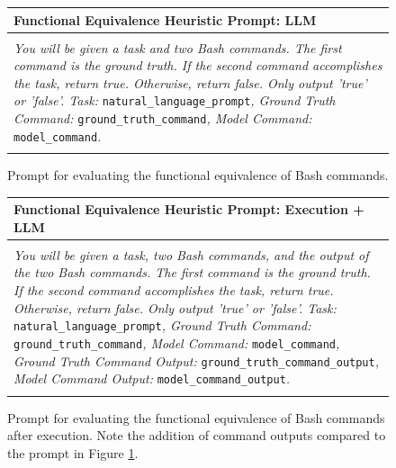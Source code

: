 \documentclass[11pt]{article}
\begin{document}
\begin{figure}[ht!]
  \centering
  \small
  \begin{tabular}{l}
    \hline
    \textbf{Functional Equivalence Heuristic Prompt: LLM} \\
    \hline
    \\
    \begin{minipage}{0.97\textwidth}
      \textit{You will be given a task and two Bash commands. The first command is the ground truth. If the second command accomplishes the task, return true. Otherwise, return false. Only output 'true' or 'false'. Task: } \texttt{natural\allowbreak\_language\allowbreak\_prompt}\textit{, Ground Truth Command: }\texttt{ground\allowbreak\_truth\allowbreak\_command}\textit{, Model Command: }\texttt{model\allowbreak\_command}\textit{.}
    \end{minipage}
    \\\\
    \hline
  \end{tabular}
  \caption{Prompt for evaluating the functional equivalence of Bash commands.}
  \label{fig:prompt-feh-llm}
\end{figure}

\begin{figure}[ht!]
  \centering
  \small
  \begin{tabular}{l}
    \hline
    \textbf{Functional Equivalence Heuristic Prompt: Execution + LLM} \\
    \hline
    \\
    \begin{minipage}{0.97\textwidth}
      \textit{You will be given a task, two Bash commands, and the output of the two Bash commands. The first command is the ground truth. If the second command accomplishes the task, return true. Otherwise, return false. Only output 'true' or 'false'. Task: } \texttt{natural\allowbreak\_language\allowbreak\_prompt}\textit{, Ground Truth Command: }\texttt{ground\allowbreak\_truth\allowbreak\_command}\textit{, Model Command: }\texttt{model\allowbreak\_command}\textit{, Ground Truth Command Output: }\texttt{ground\allowbreak\_truth\allowbreak\_command\allowbreak\_output}\textit{, Model Command Output: }\texttt{model\allowbreak\_command\allowbreak\_output}\textit{.}
    \end{minipage}
    \\\\
    \hline
  \end{tabular}
  \caption{Prompt for evaluating the functional equivalence of Bash commands after execution. Note the addition of command outputs compared to the prompt in Figure \ref{fig:prompt-feh-llm}.}
  \label{fig:prompt-feh-exec-llm}
\end{figure}
\end{document}
